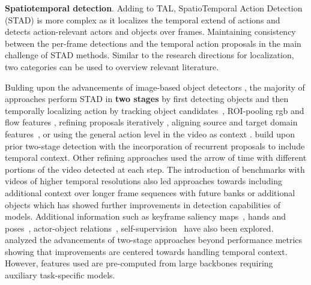 \documentclass[smallextended,twocolumn,natbib]{svjour3}
\begin{document}
\noindent
\textbf{Spatiotemporal detection}. Adding to TAL, SpatioTemporal Action Detection (STAD) is more complex as it localizes the temporal extend of actions and detects action-relevant actors and objects over frames. Maintaining consistency between the per-frame detections and the temporal action proposals in the main challenge of STAD methods. Similar to the research directions for localization, two categories can be used to overview relevant literature. 


Bulding upon the advancements of image-based object detectors \citep{girshick2014rich,girshick2015fast}, the majority of approaches perform STAD in \textbf{two stages} by first detecting objects and then temporally localizing action by tracking object candidates~\citep{jain2014action,weinzaepfel2015learning}, ROI-pooling rgb and flow features \citep{peng2016multi}, refining proposals iteratively \citep{soomro2015action}, aligning source and target domain features~\citep{agarwal2020unsupervised}, or using the general action level in the video as context \citep{mettes2016spot}. \citet{li2018recurrent} build upon prior two-stage detection with the incorporation of recurrent proposals to include temporal context. Other refining approaches \citep{singh2017online} used the arrow of time with different portions of the video detected at each step. The introduction of benchmarks with videos of higher temporal resolutions \citep{gu2018ava} also led approaches towards including additional context over longer frame sequences with future banks \citep{feng2021relation,pan2021actor,tang2020asynchronous,wang2018videos,wu2019long,wu2022memvit} or additional objects \citep{arnab2021unified,hou2017tube,zhang2019structured} which has showed further improvements in detection capabilities of models. Additional information such as keyframe saliency maps~\citep{li2020actions,ulutan2020actor}, hands and poses~\citep{faure2023holistic}, actor-object relations~\citep{sun2018actor}, self-supervision~\citep{wang2023videomae} have also been explored. \citet{alwassel2018diagnosing} analyzed the advancements of two-stage approaches beyond performance metrics showing that improvements are centered towards handling temporal context. However, features used are pre-computed from large backbones requiring auxiliary task-specific models.  
\end{document}
